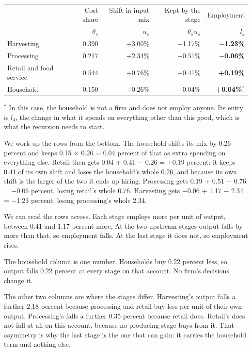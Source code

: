 \documentclass[11pt,a4paper]{article}
\begin{document}
\begin{center}
\small
\begin{tabular}{lrrrr}
\toprule
 & Cost share & Shift in input mix & Kept by the stage & Employment \\
 & $\theta_s$ & $\alpha_s$ & $\theta_s \alpha_s$ & $l_s$ \\
\midrule
Harvesting & 0.390 & +3.00\% & +1.17\% & \textbf{$-$1.23\%} \\
Processing & 0.217 & +2.34\% & +0.51\% & \textbf{$-$0.06\%} \\
Retail and food service & 0.544 & +0.76\% & +0.41\% & \textbf{+0.19\%} \\
Household & 0.150 & +0.26\% & +0.04\% & \textbf{+0.04\%}$^{*}$ \\
\bottomrule
\end{tabular}

\smallskip
\begin{minipage}{0.9\textwidth}
\footnotesize $^{*}$ In this case, the household is not a firm and does not employ anyone. Its entry is $l_4$, the change in what it spends on everything other than this good, which is what the recursion needs to start.
\end{minipage}
\end{center}

We work up the rows from the bottom. The household shifts its mix by 0.26 percent and keeps 0.15 $\times$ 0.26 = 0.04 percent of that as extra spending on everything else. Retail then gets 0.04 + 0.41 $-$ 0.26 = $+$0.19 percent: it keeps 0.41 of its own shift and loses the household's whole 0.26, and because its own shift is the larger of the two it ends up hiring. Processing gets 0.19 + 0.51 $-$ 0.76 = $-$0.06 percent, losing retail's whole 0.76. Harvesting gets $-$0.06 + 1.17 $-$ 2.34 = $-$1.23 percent, losing processing's whole 2.34.

We can read the rows across. Each stage employs more per unit of output, between 0.41 and 1.17 percent more. At the two upstream stages output falls by more than that, so employment falls. At the last stage it does not, so employment rises.

The household column is one number. Households buy 0.22 percent less, so output falls 0.22 percent at every stage on that account. No firm's decisions change it.

The other two columns are where the stages differ. Harvesting's output falls a further 2.18 percent because processing and retail buy less per unit of their own output. Processing's falls a further 0.35 percent because retail does. Retail's does not fall at all on this account, because no producing stage buys from it. That asymmetry is why the last stage is the one that can gain: it carries the household term and nothing else.
\end{document}
